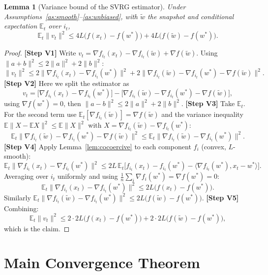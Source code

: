\documentclass{article}
\newtheorem{lemma}{Lemma}
\begin{document}
\begin{lemma}[Variance bound of the SVRG estimator]\label{lem:var}
Under Assumptions~\ref{as:smooth}--\ref{as:unbiased}, with $\tilde{w}$ the snapshot and conditional expectation $\mathbb{E}_t$ over $i_t$,
\[
\mathbb{E}_t\|v_t\|^2 \le 4L\big(f(x_t) - f(w^*)\big) + 4L\big(f(\tilde{w}) - f(w^*)\big).
\]
\end{lemma}

\begin{proof}
\textbf{[Step V1]} Write $v_t = \nabla f_{i_t}(x_t) - \nabla f_{i_t}(\tilde{w}) + \nabla f(\tilde{w})$. Using $\|a+b\|^2 \le 2\|a\|^2 + 2\|b\|^2$:
\[
\|v_t\|^2 \le 2\|\nabla f_{i_t}(x_t) - \nabla f_{i_t}(w^*)\|^2
+ 2\|\nabla f_{i_t}(\tilde{w}) - \nabla f_{i_t}(w^*) - \nabla f(\tilde{w})\|^2.
\]
\textbf{[Step V2]} Here we split the estimator as
\[
v_t = \big[\nabla f_{i_t}(x_t) - \nabla f_{i_t}(w^*)\big] - \big[\nabla f_{i_t}(\tilde{w}) - \nabla f_{i_t}(w^*) - \nabla f(\tilde{w})\big],
\]
using $\nabla f(w^*)=0$, then $\|a-b\|^2\le 2\|a\|^2+2\|b\|^2$.
\textbf{[Step V3]} Take $\mathbb{E}_t$. For the second term use $\mathbb{E}_t[\nabla f_{i_t}(\tilde{w})] = \nabla f(\tilde{w})$ and the variance inequality $\mathbb{E}\|X-\mathbb{E}X\|^2 \le \mathbb{E}\|X\|^2$ with $X = \nabla f_{i_t}(\tilde{w}) - \nabla f_{i_t}(w^*)$:
\[
\mathbb{E}_t\|\nabla f_{i_t}(\tilde{w}) - \nabla f_{i_t}(w^*) - \nabla f(\tilde{w})\|^2 \le \mathbb{E}_t\|\nabla f_{i_t}(\tilde{w}) - \nabla f_{i_t}(w^*)\|^2.
\]
\textbf{[Step V4]} Apply Lemma~\ref{lem:cocoercive} to each component $f_i$ (convex, $L$-smooth):
\[
\mathbb{E}_t\|\nabla f_{i_t}(x_t) - \nabla f_{i_t}(w^*)\|^2 \le 2L\,\mathbb{E}_t\big[f_{i_t}(x_t) - f_{i_t}(w^*) - \langle \nabla f_{i_t}(w^*), x_t-w^*\rangle\big].
\]
Averaging over $i_t$ uniformly and using $\frac1n\sum_i \nabla f_i(w^*)=\nabla f(w^*)=0$:
\[
\mathbb{E}_t\|\nabla f_{i_t}(x_t) - \nabla f_{i_t}(w^*)\|^2 \le 2L\big(f(x_t)-f(w^*)\big).
\]
Similarly $\mathbb{E}_t\|\nabla f_{i_t}(\tilde{w}) - \nabla f_{i_t}(w^*)\|^2 \le 2L\big(f(\tilde{w})-f(w^*)\big)$.
\textbf{[Step V5]} Combining:
\[
\mathbb{E}_t\|v_t\|^2 \le 2\cdot 2L\big(f(x_t)-f(w^*)\big) + 2\cdot 2L\big(f(\tilde{w})-f(w^*)\big),
\]
which is the claim.
\end{proof}

\section*{Main Convergence Theorem}
\end{document}
